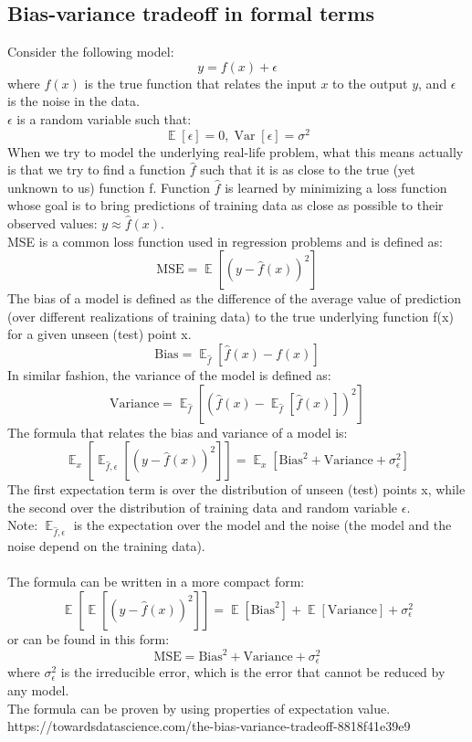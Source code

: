 \documentclass{article}
\DeclareMathOperator{\E}{\mathbb{E}}
\DeclareMathOperator{\Var}{Var}
\begin{document}
\subsection{Bias-variance tradeoff in formal terms}
Consider the following model:
\[y = f(x) + \epsilon\]
where $f(x)$ is the true function that relates the input $x$ to the output $y$, and $\epsilon$ is the noise in the data.\\
$\epsilon$ is a random variable such that:
\[\E[\epsilon] = 0, \Var[\epsilon] = \sigma^2\]
When we try to model the underlying real-life problem, what this means actually is that we try to find a function $\hat{f}$ such that it is as close to the true (yet unknown to us) function f.
Function $\hat{f}$ is learned by minimizing a loss function whose goal is to bring predictions of training data as close as possible to their observed values: $y \approx \hat{f}(x)$.\\
MSE is a common loss function used in regression problems and is defined as:
\[\text{MSE} = \E[(y - \hat{f}(x))^2]\]
The bias of a model is defined as the difference of the average value of prediction (over different realizations of training data) to the true underlying function f(x) for a given unseen (test) point x.
\[\text{Bias} = \E_{\hat{f}}[\hat{f}(x) - f(x)]\]
In similar fashion, the variance of the model is defined as:
\[\text{Variance} = \E_{\hat{f}}[(\hat{f}(x) - \E_{\hat{f}}[\hat{f}(x)])^2]\]
The formula that relates the bias and variance of a model is:
\[\E_x[\E_{\hat{f}, \epsilon}[(y - \hat{f}(x))^2]] = \E_x[\text{Bias}^2 + \text{Variance} + \sigma_\epsilon^2]\]
The first expectation term is over the distribution of unseen (test) points x, while the second over the distribution of training data and random variable $\epsilon$.\\
Note: $\E_{\hat{f}, \epsilon}$ is the expectation over the model and the noise (the model and the noise depend on the training data).\\\\
The formula can be written in a more compact form:
\[\E[\E[(y - \hat{f}(x))^2]] = \E[\text{Bias}^2] + \E[\text{Variance}] + \sigma_\epsilon^2\]
or can be found in this form:
\[\text{MSE} = \text{Bias}^2 + \text{Variance} + \sigma_\epsilon^2\]
where $\sigma_\epsilon^2$ is the irreducible error, which is the error that cannot be reduced by any model.\\
The formula can be proven by using properties of expectation value.\\
https://towardsdatascience.com/the-bias-variance-tradeoff-8818f41e39e9
\end{document}
